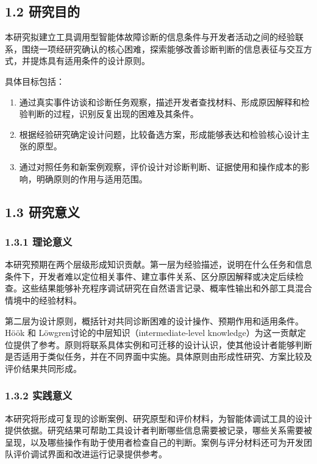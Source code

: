 \subsection{1.2 研究目的}

本研究拟建立工具调用型智能体故障诊断的信息条件与开发者活动之间的经验联系，围绕一项经研究确认的核心困难，探索能够改善诊断判断的信息表征与交互方式，并提炼具有适用条件的设计原则。

具体目标包括：

\begin{enumerate}
  \item 通过真实事件访谈和诊断任务观察，描述开发者查找材料、形成原因解释和检验判断的过程，识别反复出现的困难及其条件。
  \item 根据经验研究确定设计问题，比较备选方案，形成能够表达和检验核心设计主张的原型。
  \item 通过对照任务和新案例观察，评价设计对诊断判断、证据使用和操作成本的影响，明确原则的作用与适用范围。
\end{enumerate}

\subsection{1.3 研究意义}

\subsubsection{1.3.1 理论意义}

本研究预期在两个层级形成知识贡献。第一层为经验描述，说明在什么任务和信息条件下，开发者难以定位相关事件、建立事件关系、区分原因解释或决定后续检查。这些结果能够补充程序调试研究在自然语言记录、概率性输出和外部工具混合情境中的经验材料。

第二层为设计原则，概括针对共同诊断困难的设计操作、预期作用和适用条件。Höök 和 Löwgren\cite{hook2012strong}讨论的中层知识（intermediate-level knowledge）为这一贡献定位提供了参考。原则将联系具体实例和可迁移的设计认识，使其他设计者能够判断是否适用于类似任务，并在不同界面中实施。具体原则由形成性研究、方案比较及评价结果共同形成。

\subsubsection{1.3.2 实践意义}

本研究将形成可复现的诊断案例、研究原型和评价材料，为智能体调试工具的设计提供依据。研究结果可帮助工具设计者判断哪些信息需要被记录，哪些关系需要被呈现，以及哪些操作有助于使用者检查自己的判断。案例与评分材料还可为开发团队评价调试界面和改进运行记录提供参考。

